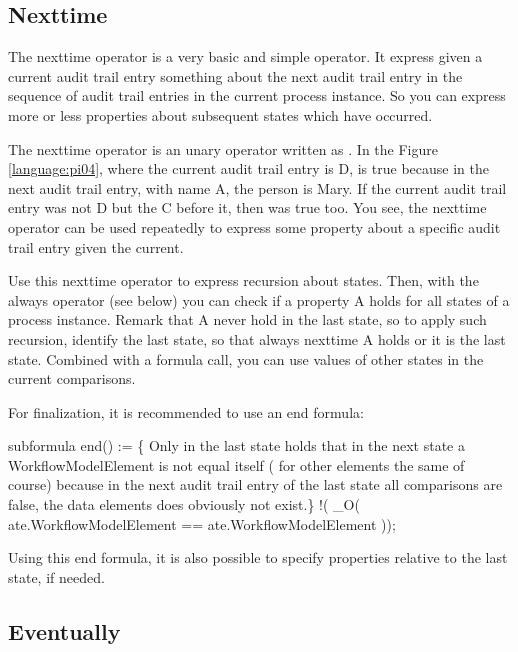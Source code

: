 \subsection{Nexttime}
\label{language:nexttime}

The nexttime operator is a very basic and simple operator. It express given a
current audit trail entry something about the next audit trail entry in the
sequence of audit trail entries in the current process instance. So you can
express more or less properties about subsequent states which have occurred.


The nexttime operator is an unary operator written as .
In the Figure \ref{language:pi04}, where the current audit trail entry is D,
 is true because in the next audit trail entry,
with name A, the person is Mary. If the current audit trail entry was not D
but the C before it, then  was true too.
You see, the nexttime operator can be used repeatedly to express some
property about a specific audit trail entry given the current.

Use this nexttime operator to express recursion about states. Then, with the always
operator (see below) you can check if a property A holds for all states of a
process instance. Remark that A never hold in the last state, so to apply such
recursion, identify the last state, so that always nexttime A holds or it is
the last state. Combined with a formula call, you can use values of other
states in the current comparisons.

For finalization, it is recommended to use an end formula: 
\begin{ltlcode}
subformula end() := \{ 
 Only in the last state holds that in the next state a
 WorkflowModelElement is not equal itself ( for other elements the same of
 course) because in the next audit trail entry of the last state all
 comparisons are false, the data elements does obviously not exist.\}
  !( _O( ate.WorkflowModelElement == ate.WorkflowModelElement ));
\end{ltlcode} 
  
  Using this end formula, it is also possible to specify properties relative to the last
 state, if needed.

\subsection{Eventually}
\label{language:eventually}

